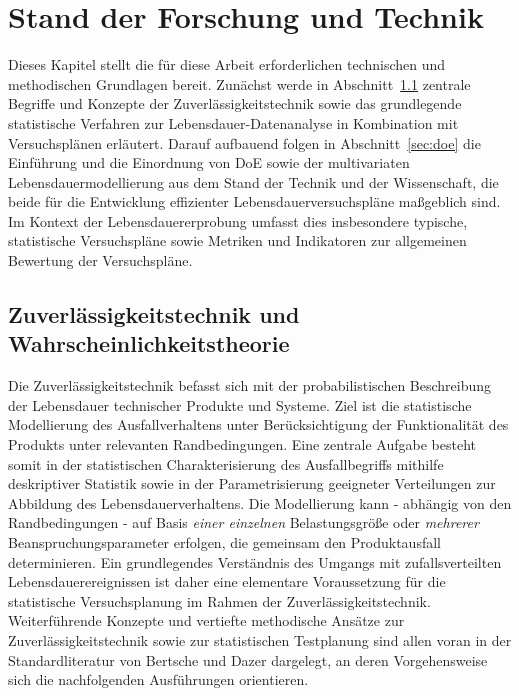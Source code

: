 
\chapter{Stand der Forschung und Technik} \label{chap:stand}

Dieses Kapitel stellt die für diese Arbeit erforderlichen technischen und methodischen Grundlagen bereit. Zunächst werde in Abschnitt~\ref{sec:zuv} zentrale Begriffe und Konzepte der Zuverlässigkeitstechnik sowie das grundlegende statistische Verfahren zur Lebensdauer-Datenanalyse in Kombination mit Versuchsplänen erläutert.
Darauf aufbauend folgen in Abschnitt~\ref{sec:doe} die Einführung und die Einordnung von \acs{DoE} sowie der multivariaten Lebensdauermodellierung aus dem Stand der Technik und der Wissenschaft, die beide für die Entwicklung effizienter Lebensdauerversuchspläne maßgeblich sind.
Im Kontext der Lebensdauererprobung umfasst dies insbesondere typische, statistische Versuchspläne sowie Metriken und Indikatoren zur allgemeinen Bewertung der Versuchspläne.

\section{Zuverlässigkeitstechnik und Wahrscheinlichkeitstheorie} \label{sec:zuv}
Die Zuverlässigkeitstechnik befasst sich mit der probabilistischen Beschreibung der Lebensdauer technischer Produkte und Systeme.
Ziel ist die statistische Modellierung des Ausfallverhaltens unter Berücksichtigung der Funktionalität des Produkts unter relevanten Randbedingungen.
Eine zentrale Aufgabe besteht somit in der statistischen Charakterisierung des Ausfallbegriffs mithilfe deskriptiver Statistik sowie in der Parametrisierung geeigneter Verteilungen zur Abbildung des Lebensdauerverhaltens.
Die Modellierung kann - abhängig von den Randbedingungen - auf Basis \textit{einer einzelnen} Belastungsgröße oder \textit{mehrerer} Beanspruchungsparameter erfolgen, die gemeinsam den Produktausfall determinieren.
Ein grundlegendes Verständnis des Umgangs mit zufallsverteilten Lebensdauerereignissen ist daher eine elementare Voraussetzung für die statistische Versuchsplanung im Rahmen der Zuverlässigkeitstechnik.
Weiterführende Konzepte und vertiefte methodische Ansätze zur Zuverlässigkeitstechnik sowie zur statistischen Testplanung sind allen voran in der Standardliteratur von Bertsche und Dazer \cite{Bertsche.2022} dargelegt, an deren Vorgehensweise sich die nachfolgenden Ausführungen orientieren.

